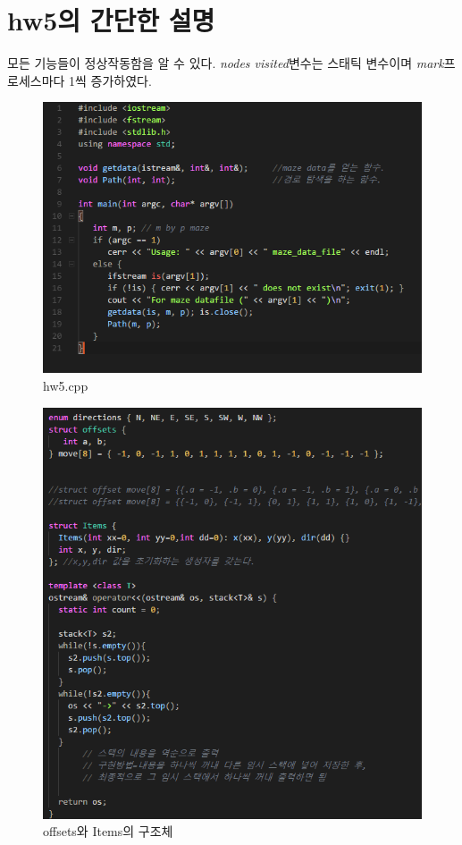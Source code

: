 \documentclass[a4paper,12pt]{article}
\begin{document}
 
\section{hw5의 간단한 설명}
모든 기능들이 정상작동함을 알 수 있다. \textsl{nodes visited}변수는 스태틱 변수이며 \textsl{mark}프로세스마다 1씩 증가하였다.
 

\newpage
\begin{figure}[t]\vspace*{4pt} 
\centerline{\includegraphics[width=1.0\columnwidth]{hw5cpp}} 
\caption{hw5.cpp}\vspace*{-6pt} 
\label{figure:hw5cpp} 
\end{figure} 

\begin{figure}[t]\vspace*{4pt} 
\centerline{\includegraphics[width=1.0\columnwidth]{maze1}} 
\caption{offsets와 Items의 구조체}\vspace*{-6pt} 
\label{figure:matrixa_overload} 
\end{figure} 
\end{document}
